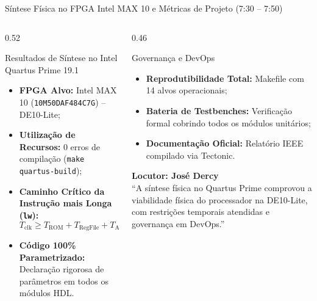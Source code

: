 \documentclass[aspectratio=169, 10pt]{beamer}
\begin{document}
\begin{frame}{Síntese Física no FPGA Intel MAX 10 e Métricas de Projeto (7:30 -- 7:50)}
  \begin{columns}[T]
    \begin{column}{0.52\textwidth}
      \begin{block}{Resultados de Síntese no Intel Quartus Prime 19.1}
        \footnotesize
        \begin{itemize}\setlength{\itemsep}{1pt}
          \item \textbf{FPGA Alvo:} Intel MAX 10 (\texttt{10M50DAF484C7G}) -- DE10-Lite;
          \item \textbf{Utilização de Recursos:} 0 erros de compilação (\texttt{make quartus-build});
          \item \textbf{Caminho Crítico da Instrução mais Longa (\texttt{lw}):}
            $$T_{\text{clk}} \ge T_{\text{ROM}} + T_{\text{RegFile}} + T_{\text{ALU}} + T_{\text{RAM}} + T_{\text{Mux}} + T_{\text{Setup}}$$
          \item \textbf{Código 100\% Parametrizado:} Declaração rigorosa de parâmetros em todos os módulos HDL.
        \end{itemize}
      \end{block}
    \end{column}

    \begin{column}{0.46\textwidth}
      \begin{exampleblock}{Governança e DevOps}
        \footnotesize
        \begin{itemize}\setlength{\itemsep}{1pt}
          \item \textbf{Reprodutibilidade Total:} Makefile com 14 alvos operacionais;
          \item \textbf{Bateria de Testbenches:} Verificação formal cobrindo todos os módulos unitários;
          \item \textbf{Documentação Oficial:} Relatório IEEE compilado via Tectonic.
        \end{itemize}
      \end{exampleblock}

      \begin{tcolorbox}[speakerbox]
        \textbf{Locutor: José Dercy}\\
        \vspace{1mm}
        \scriptsize
        ``A síntese física no Quartus Prime comprovou a viabilidade física do processador na DE10-Lite, com restrições temporais atendidas e governança em DevOps.''
      \end{tcolorbox}
    \end{column}
  \end{columns}
\end{frame}
\end{document}
